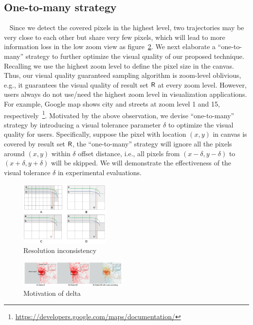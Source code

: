 \subsection{One-to-many strategy}~\label{sec:one_to_many}
Since we detect the covered pixels in the highest level, two trajectories may be very close to each other but share very few pixels, which will lead to more information loss in the low zoom view as figure~\ref{fig:one_to_many}.  
We next elaborate a ``one-to-many'' strategy to further optimize the visual quality of our proposed technique.
Recalling we use the highest zoom level to define the pixel size in the canvas.
Thus, our visual quality guaranteed sampling algorithm is zoom-level oblivious, e.g., it guarantees the visual quality of result set $\mathsf{R}$ at every zoom level.
However, users always do not use/need the highest zoom level in visualization applications.
For example, Google map shows city and streets at zoom level 1 and 15, respectively~\footnote{\url{https://developers.google.com/maps/documentation/}}.
Motivated by the above observation, we devise ``one-to-many'' strategy by introducing a visual tolerance parameter $\delta$ to optimize the visual quality for users.
Specifically, suppose the pixel with location $(x,y)$ in canvas is covered by result set $\mathsf{R}$, 
the ``one-to-many'' strategy will ignore all the pixels around $(x,y)$ within $\delta$ offset distance, i.e., all pixels from $(x-\delta, y-\delta)$ to $(x+\delta, y+\delta)$ will be skipped.
We will demonstrate the effectiveness of the visual tolerance $\delta$ in experimental evaluations.


\begin{figure}[t]
	\centering
	\includegraphics[width=0.4\textwidth]{pictures/problemsolveing/one_to_many.pdf}
	\vspace{-5mm}
	\caption{Resolution inconsistency}
	\vspace{-5mm}
	\label{fig:one_to_many}
\end{figure}



\begin{figure}[t]
	\centering
	\includegraphics[width=0.48\textwidth]{pictures/problemsolveing/delta_motivation.pdf}
	\vspace{-5mm}
	\caption{Motivation of delta}
	\vspace{-5mm}
	\label{fig:one_to_many}
\end{figure}